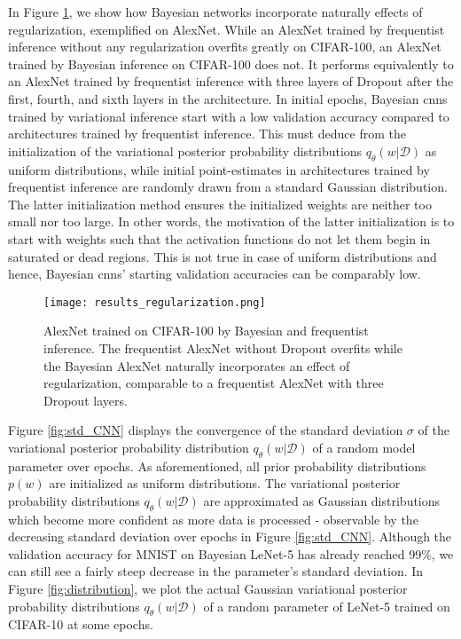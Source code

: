 \newline In Figure \ref{fig:regularisation}, we show how Bayesian networks incorporate naturally effects of regularization, exemplified on AlexNet. While an AlexNet trained by frequentist inference without any regularization overfits greatly on CIFAR-100, an AlexNet trained by Bayesian inference on CIFAR-100 does not. It performs equivalently to an AlexNet trained by frequentist inference with three layers of Dropout after the first, fourth, and sixth layers in the architecture. In initial epochs, Bayesian \acp{cnn} trained by variational inference start with a low validation accuracy compared to architectures trained by frequentist inference. This must deduce from the initialization of the variational posterior probability distributions $q_{\theta}(w|\mathcal{D})$ as uniform distributions, while initial point-estimates in architectures trained by frequentist inference are randomly drawn from a standard Gaussian distribution. The latter initialization method ensures the initialized weights are neither too small nor too large. In other words, the motivation of the latter initialization is to start with weights such that the activation functions do not let them begin in saturated or dead regions. This is not true in case of uniform distributions and hence, Bayesian \acp{cnn}' starting validation accuracies can be comparably low.
%
\begin{figure}[t!] 
\centering
\texttt{[image: results\_regularization.png]}
\caption{AlexNet trained on CIFAR-100 by Bayesian and frequentist inference. The frequentist AlexNet without Dropout overfits while the Bayesian AlexNet naturally incorporates an effect of regularization, comparable to a frequentist AlexNet with three Dropout layers.}
\label{fig:regularisation}
\end{figure}
%
\newline Figure \ref{fig:std_CNN} displays the convergence of the standard deviation $\sigma$ of the variational posterior probability distribution $q_{\theta}(w|\mathcal{D})$ of a random model parameter over epochs. As aforementioned, all prior probability distributions $p(w)$ are initialized as uniform distributions. The variational posterior probability distributions $q_{\theta}(w|\mathcal{D})$ are approximated as Gaussian distributions which become more confident as more data is processed - observable by the decreasing standard deviation over epochs in Figure \ref{fig:std_CNN}. Although the validation accuracy for MNIST on Bayesian LeNet-5 has already reached 99\%, we can still see a fairly steep decrease in the parameter's standard deviation. In Figure \ref{fig:distribution}, we plot the actual Gaussian variational posterior probability distributions $q_{\theta}(w|\mathcal{D})$ of a random parameter of LeNet-5 trained on CIFAR-10 at some epochs.
